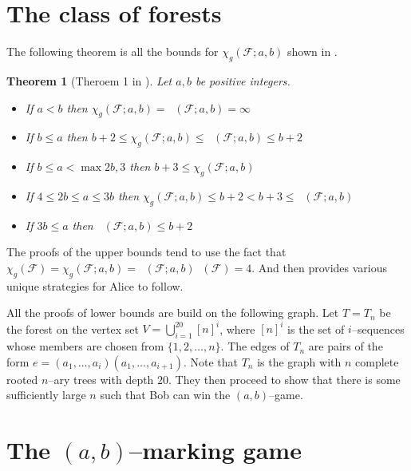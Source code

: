 \documentclass[11pt]{article}
\numberwithin{figure}{section}
\newtheorem{theorem}{Theorem}
\theoremstyle{definition}
\newcommand{\FF}{\mathcal{F}} %
\DeclareMathOperator{\col}{col_g}
\begin{document}
    \section{The class of forests}
    The following theorem is all the bounds for $\chi_g(\FF;a,b)$ shown in \cite{kierstead2005}.    
    \begin{theorem} [Theroem 1 in \cite{kierstead2005}]
        Let $a,b$ be positive integers.
        \begin{itemize}
            \item If $a<b$ then $\chi_g(\FF;a,b)=\col(\FF;a,b)=\infty$
            \item If $b\leq a$ then $b+2\leq \chi_g(\FF;a,b)\leq \col(\FF;a,b)\leq b+2$    
            \item If $b\leq a < \max{2b,3}$ then $b+3 \leq \chi_g(\FF;a,b)$
            \item If $4\leq 2b \leq a \leq 3b$ then $\chi_g(\FF;a,b)\leq b+2<b+3\leq \col(\FF;a,b)$
            \item If $3b\leq a$ then $\col(\FF;a,b)\leq b+2$ 
        \end{itemize}
    \end{theorem}
    
    The proofs of the upper bounds tend to use the fact that     
    $\chi_g(\FF)= \chi_g(\FF;a,b)= \col(\FF;a,b)\col(\FF)=4$. And then provides various unique strategies for Alice to follow.
    
    All the proofs of lower bounds are build on the following graph. Let $T=T_n$ be the forest on the vertex set $V=\bigcup_{i=1}^{20}[n]^i$, where $[n]^i$ is the set of $i$--sequences whose members are chosen from $\{1,2,\dots,n\}$. %
    The edges of $T_n$ are pairs of the form $e= (a_1,\dots,a_i) (a_1,\dots,a_{i+1})$. Note that $T_n$ is the graph with $n$ complete rooted $n$--ary trees with depth $20$. They then proceed to show that there is some sufficiently large $n$ such that Bob can win the $(a,b)$--game.
    
    
    \section{The $(a,b)$--marking game}
    
\end{document}
